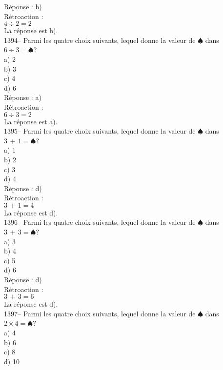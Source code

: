 ﻿\documentclass[letterpaper, 12pt]{article}
\begin{document}
R\'eponse : b)\\

R\'etroaction : \\
$4\div2=2$\\
La r\'eponse est b).\\

1394-- Parmi les quatre choix suivants, lequel donne la valeur de
$\spadesuit$ dans $6\div3=\spadesuit$?\\
a) 2\\
b) 3\\
c) 4\\
d) 6\\

R\'eponse : a)\\

R\'etroaction : \\
$6\div3=2$\\
La r\'eponse est a).\\

1395-- Parmi les quatre choix suivants, lequel donne la valeur de
$\spadesuit$ dans $3\,+\,1=\spadesuit$?\\
a) 1\\
b) 2\\
c) 3\\
d) 4\\

R\'eponse : d)\\

R\'etroaction : \\
$3\,+\,1=4$\\
La r\'eponse est d).\\

1396-- Parmi les quatre choix suivants, lequel donne la valeur de
$\spadesuit$ dans $3\,+\,3=\spadesuit$?\\
a) 3\\
b) 4\\
c) 5\\
d) 6\\

R\'eponse : d)\\

R\'etroaction : \\
$3\,+\,3=6$\\
La r\'eponse est d).\\

1397-- Parmi les quatre choix suivants, lequel donne la valeur de
$\spadesuit$ dans $2\times4=\spadesuit$?\\
a) 4\\
b) 6\\
c) 8\\
d) 10\\
\end{document}

